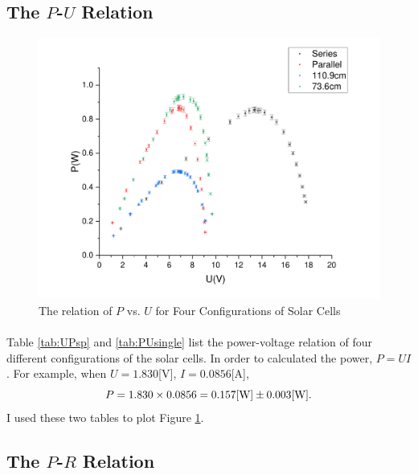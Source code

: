 \documentclass[a4paper]{article}
\begin{document}
    \subsection{The $P$-$U$ Relation}
    
    \begin{figure}[!ht]
        \centering
        \includegraphics[width=\textwidth]{fig/PvsV.pdf}
        \caption{The relation of $P$ vs. $U$ for Four Configurations of Solar Cells}
        \label{fig:PvsV}
    \end{figure}
    \paragraph{} Table \ref{tab:UPsp} and \ref{tab:PUsingle} list the power-voltage relation of four different configurations of the solar cells. In order to calculated the power, $P=UI$. For example, when $U=1.830$[V], $I=0.0856$[A], $$P=1.830\times 0.0856=0.157[\rm W]\pm 0.003[W].$$ I used these two tables to plot Figure \ref{fig:PvsV}.
    \subsection{The $P$-$R$ Relation}
    
\end{document}
